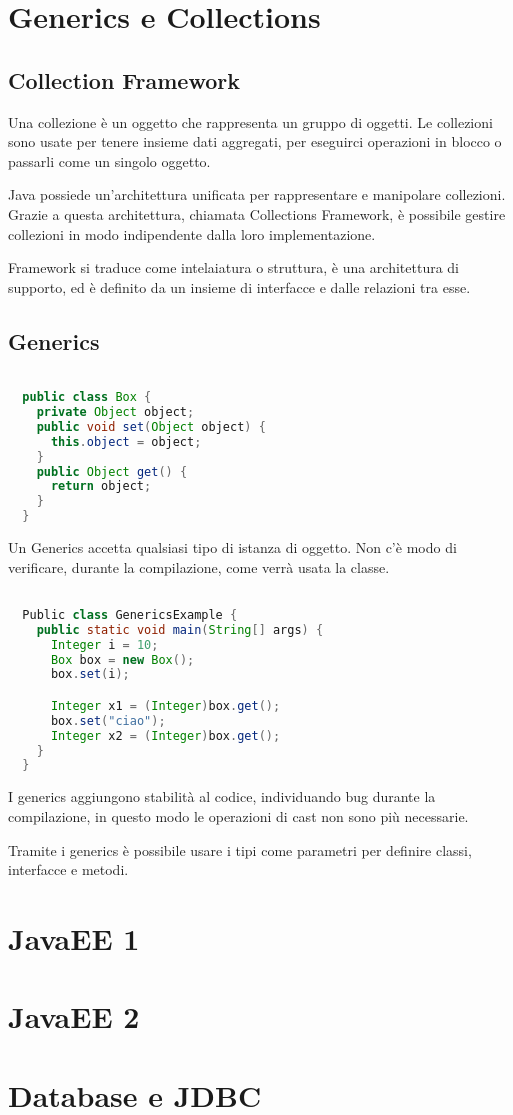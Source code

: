 \documentclass[a4paper,12pt,twoside]{book}
\begin{document}
\chapter{Generics e Collections}
\section{Collection Framework}

Una collezione è un oggetto che rappresenta un gruppo di oggetti. Le
collezioni sono usate per tenere insieme dati aggregati, per eseguirci
operazioni in blocco o passarli come un singolo oggetto.

Java possiede un'architettura unificata per rappresentare e manipolare
collezioni. Grazie a questa architettura, chiamata Collections
Framework, è possibile gestire collezioni in modo indipendente dalla
loro implementazione.

Framework si traduce come intelaiatura o struttura, è una architettura
di supporto, ed è definito da un insieme di interfacce e dalle
relazioni tra esse.

\section{Generics}
\begin{lstlisting}[caption={},
  label={lst:generics},language=Java]

  public class Box {
    private Object object;
    public void set(Object object) {
      this.object = object;
    }
    public Object get() {
      return object;
    }
  }
\end{lstlisting}

Un Generics accetta qualsiasi tipo di istanza di oggetto. Non c'è modo
di verificare, durante la compilazione, come verrà usata la classe.

\begin{lstlisting}[caption={Generics},
  label={lst:genericsExample},language=Java]

  Public class GenericsExample {
    public static void main(String[] args) {
      Integer i = 10;
      Box box = new Box();
      box.set(i);

      Integer x1 = (Integer)box.get();
      box.set("ciao");
      Integer x2 = (Integer)box.get();
    }
  }

\end{lstlisting}

I generics aggiungono stabilità al codice, individuando bug durante la
compilazione, in questo modo le operazioni di cast non sono più
necessarie.

Tramite i generics è possibile usare i tipi come parametri per
definire classi, interfacce e metodi. %



\chapter{JavaEE 1}

\chapter{JavaEE 2}

\chapter{Database e JDBC}
\end{document}

